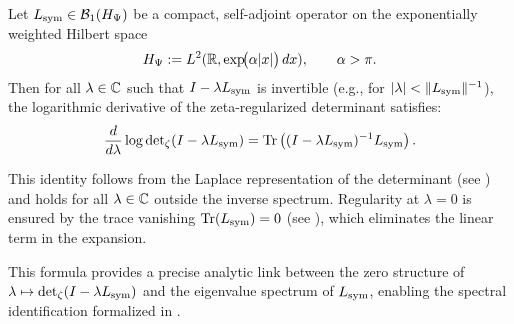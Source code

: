 \begin{lemma}
\label{lem:A_log_derivative}
Let \( L_{\mathrm{sym}} \in \mathcal{B}_1(H_{\Psi}) \) be a compact, self-adjoint operator on the exponentially weighted Hilbert space
\[
H_{\Psi} := L^2(\mathbb{R}, \exp\!\bigl(\alpha |x|\bigr) \, dx), \qquad \alpha > \pi.
\]
Then for all \( \lambda \in \mathbb{C} \) such that \( I - \lambda L_{\mathrm{sym}} \) is invertible (e.g., for \( |\lambda| < \|L_{\mathrm{sym}}\|^{-1} \)), the logarithmic derivative of the zeta-regularized determinant satisfies:
\[
\frac{d}{d\lambda} \log \det\nolimits_\zeta(I - \lambda L_{\mathrm{sym}})
= \operatorname{Tr} \left( (I - \lambda L_{\mathrm{sym}})^{-1} L_{\mathrm{sym}} \right).
\]

\medskip
\noindent
This identity follows from the Laplace representation of the determinant (see ) and holds for all \( \lambda \in \mathbb{C} \) outside the inverse spectrum. Regularity at \(\lambda = 0\) is ensured by the trace vanishing \( \operatorname{Tr}(L_{\mathrm{sym}}) = 0 \) (see ), which eliminates the linear term in the expansion.

\medskip
\noindent
This formula provides a precise analytic link between the zero structure of \( \lambda \mapsto \det\nolimits_{\zeta}(I - \lambda L_{\mathrm{sym}}) \) and the eigenvalue spectrum of \( L_{\mathrm{sym}} \), enabling the spectral identification formalized in .
\end{lemma}
